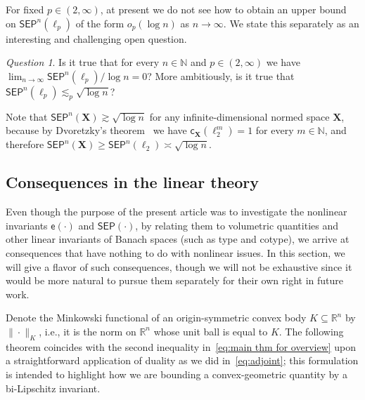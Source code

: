 \documentclass[11pt,reqno]{amsart}
\renewcommand{\ge}{\geqslant}
\newcommand{\cc}{\mathsf{c}}
\newcommand{\X}{\mathbf X}
\newcommand{\R}{\mathbb R}
\theoremstyle{remark}
\newtheorem{question}[theorem]{Question}
\renewcommand{\subset}{\subseteq}
\newcommand{\N}{\mathbb N}
\newcommand{\ee}{\mathsf{e}}
\renewcommand{\1}{\mathbf 1}
\newcommand{\sep}{\mathsf{SEP}}
\begin{document}
For fixed $p\in (2,\infty)$, at present we do not see how to obtain an upper bound on $\sep^n(\ell_p)$ of the form $o_p(\log n)$ as $n\to \infty$. We state this separately as  an interesting and  challenging open question.
\begin{question}\label{Q:dim reductoion p>2}
Is it true that for every $n\in \N$ and $p\in (2,\infty)$ we have $\lim_{n\to \infty}\sep^n(\ell_p)/\log n=0$? More ambitiously, is it true that $\sep^n(\ell_p)\lesssim_p\sqrt{\log n}$?
\end{question}
Note that $\sep^n(\X)\gtrsim \sqrt{\log n}$ for any infinite-dimensional normed space $\X$, because by Dvoretzky's theorem~\cite{Dvo60} we have $\cc_\X(\ell_2^m)=1$  for every $m\in \N$, and therefore $\sep^n(\X)\ge \sep^n(\ell_2)\asymp\sqrt{\log n}$.












\subsection{Consequences in the linear theory}\label{sec:stability intro} Even though the purpose of the present article was to investigate the nonlinear invariants $\ee(\cdot)$ and $\sep(\cdot)$, by relating them to volumetric quantities and other linear invariants  of Banach spaces (such as type and cotype), we arrive at consequences that have nothing to do with nonlinear issues.  In this section, we will give a flavor of such consequences, though we will not be exhaustive since it would be more natural to pursue them separately for their own right in future work.


Denote the Minkowski functional of an origin-symmetric convex body $K\subset \R^n$ by $\|\cdot\|_K$, i.e., it is the norm on $\R^n$ whose unit ball is equal to $K$. The following theorem coincides with the second inequality in~\eqref{eq:main thm for overview} upon a straightforward application of duality as we did in~\eqref{eq:adjoint}; this formulation  is intended to highlight how we are bounding a convex-geometric quantity by a bi-Lipschitz invariant.
\end{document}
